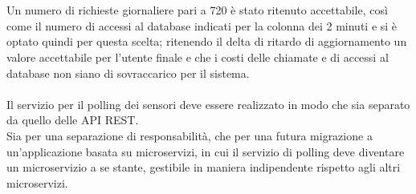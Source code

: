 \leavevmode
\\\\
Un numero di richieste giornaliere pari a 720 è stato ritenuto accettabile, così come il numero di accessi al database
indicati per la colonna dei 2 minuti e si è optato quindi per questa scelta; ritenendo il delta di ritardo di
aggiornamento un valore accettabile per l'utente finale e che i costi delle chiamate e di accessi al database non
siano di sovraccarico per il sistema.
\\\\
Il servizio per il polling dei sensori deve essere realizzato in modo che sia separato da quello delle \gls{API} \gls{REST}.
\\
Sia per una separazione di responsabilità, che per una futura migrazione a un'applicazione basata su microservizi,
in cui il servizio di polling deve diventare un microservizio a se stante, gestibile in maniera indipendente rispetto
agli altri microservizi.

